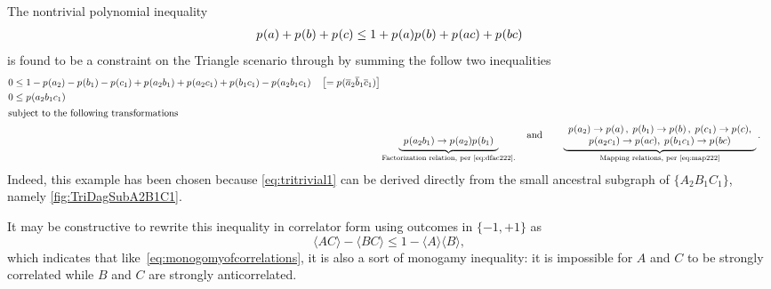 {The nontrivial polynomial inequality 
\begin{align}\label{eq:tritrivial1}
{{p_{}}\lparen a\rparen + {p_{}}\lparen b\rparen + {p_{}}\lparen c\rparen} \leq {1 + {p_{}}\lparen a\rparen {p_{}}\lparen b\rparen + {p_{}}\lparen a c\rparen + {p_{}}\lparen b c\rparen}
\end{align}
is found to be a constraint on the Triangle scenario through by summing the follow two inequalities
\begin{align}\begin{split}\label{eq:trisimplestunmapped}
 &0\leq  1 -\p{a_2} - \p{b_1} - \p{c_1}+ \p{a_2 b_1} + \p{a_2 c_1} + \p{b_1 c_1}  -\p{a_2 b_1 c_1} \quad\left[=\p{\n{a}_2 \n{b}_1 \n{c}_1}\right]
\\&0\leq \p{a_2 b_1 c_1}
\end{split}\\
\shortintertext{subject to the following transformations}
&  \underbrace{\larray{\\\p{a_2 b_1} \to \p{a_2} \p{b_1}}}_{\text{Factorization relation, per \cref{eq:dfac222}.}} \quad \text{and}\qquad
 \underbrace{\begin{array}{c}
 \p{a_2}\to\p{a}\,, 
\; \p{b_1}\to\p{b}\,, 
\; \p{c_1}\to\p{c},
\\ \p{a_2 c_1}\to \p{a c},
\; \p{b_1 c_1}\to \p{b c}
\end{array}}_{\text{Mapping relations, per \cref{eq:map222}}}.
\end{align}
Indeed, this example has been chosen because \cref{eq:tritrivial1} can be derived directly from the small ancestral subgraph of $\{A_2 B_1 C_1\}$, namely \cref{fig:TriDagSubA2B1C1}.

It may be constructive to rewrite this inequality in correlator form using outcomes in $\{-1,+1\}$ as
\[
	\langle AC\rangle - \langle BC\rangle \leq 1 - \langle A\rangle\langle B\rangle,
\]
which indicates that like~\cref{eq:monogomyofcorrelations}, it is also a sort of monogamy inequality: it is impossible for $A$ and $C$ to be strongly correlated while $B$ and $C$ are strongly anticorrelated.

}
